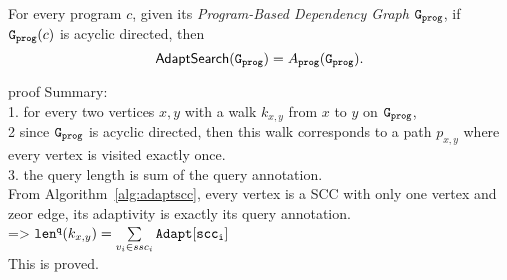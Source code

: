 \begin{thm}
  \label{thm:adaptalg_pcomplete}
  For every program $c$, given its \emph{Program-Based Dependency Graph} $\mathtt{{G_{prog}}}$,
  if $\mathtt{{G_{prog}}}(c)$ is acyclic directed, then
   $$\mathsf{AdaptSearch}(\mathtt{{G_{prog}}}) = A_{\mathtt{prog}}(\mathtt{{G_{prog}}}).$$
\end{thm}
proof Summary:
\\
1. for every two vertices $x, y$ with a walk $k_{x,y}$ from $x$ to $y$ on $\mathtt{{G_{prog}}}$, 
\\
2 since $\mathtt{{G_{prog}}}$ is acyclic directed,
then this walk corresponds to a path $p_{x,y}$
where every vertex is visited exactly once.
\\
3. the query length is sum of the query annotation.
\\
From Algorithm~\ref{alg:adaptscc}, every vertex is a SCC with only one vertex and zeor edge,
its adaptivity is exactly its query annotation.
\\
=> $\mathtt{len}^{\tt q}(k_{x,y}) = \sum\limits_{v_i \in ssc_i}\mathtt{Adapt[scc_i]}$
\\
This is proved.
